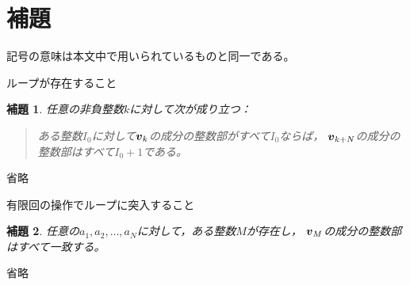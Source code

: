 \documentclass{article}
\makeatletter
\renewenvironment{proof}[1][\proofname]{\par
        \pushQED{\qed}
        \normalfont
        \topsep6\p@\@plus6\p@ \trivlist
        \item[\hskip\labelsep{\bfseries #1}\@addpunct{\bfseries}]\ignorespaces
    }{%
        \popQED\endtrivlist\@endpefalse
    }
\renewcommand{\proofname}{証明.}
\newtheorem{lemma}{補題}
\def\vector#1{\mbox{\boldmath $#1$}}
\makeatother
\begin{document}
\section{補題}

記号の意味は本文中で用いられているものと同一である。

\begin{itembox}[l]{ループが存在すること}
    \begin{lemma}
        \label{lemma:loop1}
        任意の非負整数$k$に対して次が成り立つ：
        \begin{quote}
            ある整数$I_0$に対して$\vector{v}_k$の成分の整数部がすべて$I_0$ならば，
            $\vector{v}_{k + N}$の成分の整数部はすべて$I_0 + 1$である。
        \end{quote}
    \end{lemma}
\end{itembox}

\begin{proof}
    省略
\end{proof}

\begin{itembox}[l]{有限回の操作でループに突入すること}
    \begin{lemma}
        \label{lemma:loop2}
        任意の$a_1, a_2, \dots, a_N$に対して，ある整数$M$が存在し，
        $\vector{v}_M$の成分の整数部はすべて一致する。
    \end{lemma}
\end{itembox}

\begin{proof}
    省略
\end{proof}
\end{document}
